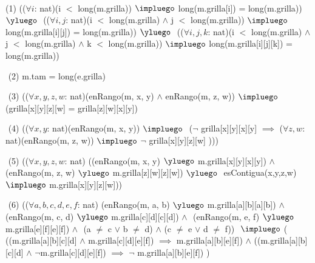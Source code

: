 \begin{Representacion}

$ $\newline
$ $\newline

(1)
(($\forall i$: nat)(i $<$ long(m.grilla)) $\impluego$ long(m.grilla[i]) = long(m.grilla)) $\yluego$ $ $\newline
(($\forall i, j$: nat)(i $<$ long(m.grilla) $\land$ j $<$ long(m.grilla)) $\impluego$ long(m.grilla[i][j]) = long(m.grilla)) $\yluego$ $ $\newline
(($\forall i, j, k$: nat)(i $<$ long(m.grilla) $\land$ j $<$ long(m.grilla) $\land$ k $<$ long(m.grilla)) $\impluego$ $ $\newline long(m.grilla[i][j][k]) = long(m.grilla))

$ $\newline
(2)
m.tam = long(e.grilla)

$ $\newline
(3) 
(($\forall x, y, z, w$: nat)(enRango(m, x, y) $\land$ enRango(m, z, w)) $\impluego$ (grilla[x][y][z][w] = grilla[z][w][x][y])

$ $\newline
(4)
(($\forall x, y$: nat)(enRango(m, x, y)) $\impluego$ $ $\newline 
($\neg$ grilla[x][y][x][y] $\implies$
($\forall z, w$: nat)(enRango(m, z, w)) $\impluego$
$\neg$ grilla[x][y][z][w] ))) 

$ $\newline
(5)
(($\forall x, y, z, w$: nat)$ $\newline
((enRango(m, x, y) $\yluego$ m.grilla[x][y][x][y]) $\land$ $ $\newline
(enRango(m, z, w) $\yluego$ m.grilla[z][w][z][w]) $\yluego$ $ $\newline
esContigua(x,y,z,w) $\impluego$ m.grilla[x][y][z][w]))


$ $\newline
(6)
(($\forall a, b, c, d, e, f$: nat)$ $\newline
(enRango(m, a, b) $\yluego$ m.grilla[a][b][a][b]) $\land$ $ $\newline
(enRango(m, c, d) $\yluego$ m.grilla[c][d][c][d]) $\land$ $ $\newline
(enRango(m, e, f) $\yluego$ m.grilla[e][f][e][f]) $\land$ $ $\newline
(a $\neq$ c $\lor$ b $\neq$ d) $\land$ (c $\neq$ e $\lor$ d $\neq$ f)) $ $\newline
$\impluego$ ( $ $\newline
((m.grilla[a][b][c][d] $\land$ m.grilla[c][d][e][f]) $\implies$ m.grilla[a][b][e][f]) $\land $\newline
((m.grilla[a][b][c][d] $\land$ $\neg$m.grilla[c][d][e][f]) $\implies$ $\neg$ m.grilla[a][b][e][f])$ $\newline
)


\end{Representacion}
